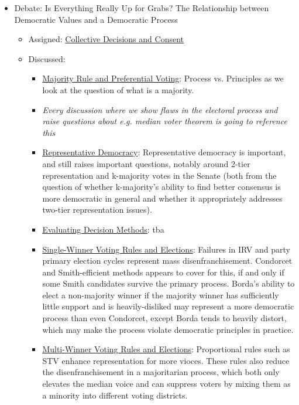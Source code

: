 \begin{itemize}
    \item Debate: Is Everything Really Up for Grabs? The Relationship between Democratic Values and a Democratic Process \autocite{Kassner2006}
    \begin{itemize}
        \item Assigned:  \hyperref[cur:collective-decisions-consent]{Collective Decisions and Consent}
        \item Discussed:
        \begin{itemize}
            \item \hyperref[cur:majority]{Majority Rule and Preferential Voting}:  Process vs. Principles as we look at the question of what is a majority.
            \item \textit{Every discussion where we show flaws in the electoral process and raise questions about e.g. median voter theorem is going to reference this}

            \item \hyperref[cur:representative-democracy]{Representative Democracy}:  Representative democracy is important, and still raises important questions, notably around 2-tier representation and k-majority votes in the Senate (both from the question of whether k-majority's ability to find better consensus is more democratic in general and whether it appropriately addresses two-tier representation issues).
            \item \hyperref[cur:evaluating-decision-methods]{Evaluating Decision Methods}: tba

            \item \hyperref[cur:single-winner-voting-rules]{Single-Winner Voting Rules and Elections}:  Failures in IRV and party primary election cycles represent mass disenfranchisement.  Condorcet and Smith-efficient methods appears to cover for this, if and only if some Smith candidates survive the primary process.  Borda's ability to elect a non-majority winner if the majority winner has sufficiently little support and is heavily-disliked may represent a more democratic process than even Condorcet, except Borda tends to heavily distort, which may make the process violate democratic principles in practice.

            \item \hyperref[cur:multi-winner-voting-rules]{Multi-Winner Voting Rules and Elections}:  Proportional rules such as STV enhance representation for more vioces.  These rules also reduce the disenfranchisement in a majoritarian process, which both only elevates the median voice and can suppress voters by mixing them as a minority into different voting districts.


\end{itemize}
\end{itemize}
\end{itemize}
